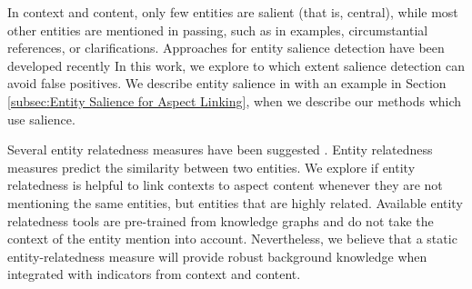 In context and content, only few entities are salient (that is, central), while most other entities are mentioned in passing, such as in examples, circumstantial references, or clarifications. Approaches for entity salience detection have been developed  recently \cite{dunietz-gillick-2014-new, xiong2018towards, swat} %
In this work, we explore to which extent salience detection can avoid false positives. We describe entity salience in with an example in Section \ref{subsec:Entity Salience for Aspect Linking}, when we describe our methods which use salience.

Several entity relatedness measures have been suggested \cite{ristoski2016rdf2vec, ruback2018computing, zeng2019measuring, ponza2017two}. Entity relatedness measures predict the similarity between two entities. We explore if entity relatedness is helpful to link contexts to aspect content whenever they are not mentioning the same entities, but entities that are highly related.
Available entity relatedness tools \cite{piccinno2014wat} are pre-trained from knowledge graphs and do not take the context of the entity mention into account. Nevertheless, we believe that a static entity-relatedness measure will provide robust background knowledge when integrated with indicators from context and content.

 
